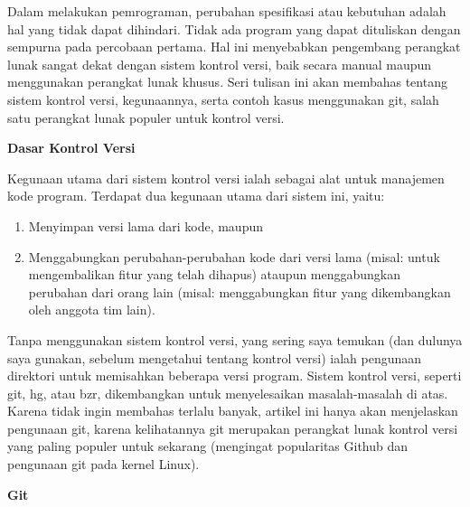 \documentclass[12pt,a4paper]{article}
\begin{document}
Dalam melakukan pemrograman, perubahan spesifikasi atau kebutuhan adalah 
hal yang tidak dapat dihindari. Tidak ada program yang dapat dituliskan 
dengan sempurna pada percobaan pertama. Hal ini menyebabkan pengembang 
perangkat lunak sangat dekat dengan sistem kontrol versi, baik secara 
manual maupun menggunakan perangkat lunak khusus. Seri tulisan ini akan 
membahas tentang sistem kontrol versi, kegunaannya, serta contoh kasus 
menggunakan git, salah satu perangkat lunak populer untuk kontrol versi.
\vspace{12pt}

\textbf{Dasar Kontrol Versi}

Kegunaan utama dari sistem kontrol versi ialah sebagai alat untuk 
manajemen kode program. Terdapat dua kegunaan utama dari sistem ini, 
yaitu:

\begin{enumerate}
\item Menyimpan versi lama dari kode, maupun
\item Menggabungkan perubahan-perubahan kode dari versi lama (misal: 
untuk mengembalikan fitur yang telah dihapus) ataupun menggabungkan 
perubahan dari orang lain (misal: menggabungkan fitur yang dikembangkan 
oleh anggota tim lain).
\setcounter{numberedCntC}{\theenumi}
\end{enumerate}
Tanpa menggunakan sistem kontrol versi, yang sering saya temukan (dan 
dulunya saya gunakan, sebelum mengetahui tentang kontrol versi) ialah 
pengunaan direktori untuk memisahkan beberapa versi program.
\vspace{12pt}
Sistem kontrol versi, seperti git, hg, atau bzr, dikembangkan untuk 
menyelesaikan masalah-masalah di atas. Karena tidak ingin membahas 
terlalu banyak, artikel ini hanya akan menjelaskan pengunaan git, karena 
kelihatannya git merupakan perangkat lunak kontrol versi yang paling 
populer untuk sekarang (mengingat popularitas Github dan pengunaan git 
pada kernel Linux).
\vspace{12pt}


\textbf{Git}
\end{document}
